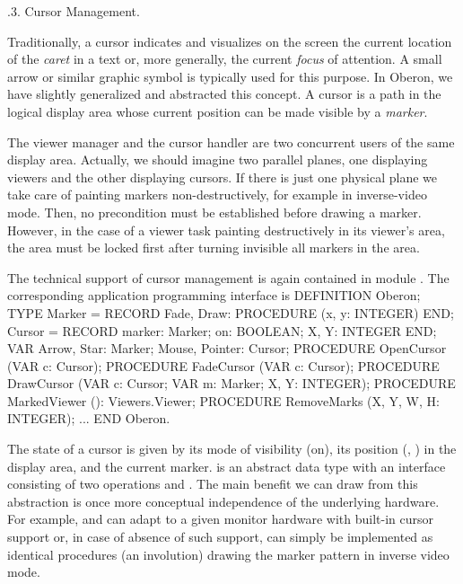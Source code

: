 
.3. Cursor Management.

Traditionally, a cursor indicates and visualizes on the screen the
current location of the \emph{caret} in a text or, more generally, the
current \emph{focus} of attention. A small arrow or similar graphic symbol is
typically used for this purpose. In Oberon, we have slightly
generalized and abstracted this concept. A cursor is a path in the
logical display area whose current position can be made visible by a
\emph{marker}.

The viewer manager and the cursor handler are two concurrent users of
the same display area. Actually, we should imagine two parallel
planes, one displaying viewers and the other displaying cursors. If
there is just one physical plane we take care of painting markers
non-destructively, for example in inverse-video mode. Then, no
precondition must be established before drawing a marker. However, in
the case of a viewer task painting destructively in its viewer's area,
the area must be locked first after turning invisible all markers in
the area.

The technical support of cursor management is again contained in
module . The corresponding application programming interface is
\begintt
DEFINITION Oberon;
  TYPE Marker = RECORD
      Fade, Draw: PROCEDURE (x, y: INTEGER)
    END;
    Cursor = RECORD
      marker: Marker;
      on: BOOLEAN;
      X, Y: INTEGER
    END;
  VAR Arrow, Star: Marker;
      Mouse, Pointer: Cursor;
  PROCEDURE OpenCursor (VAR c: Cursor);
  PROCEDURE FadeCursor (VAR c: Cursor);
  PROCEDURE DrawCursor (VAR c: Cursor; VAR m: Marker;
                        X, Y: INTEGER);
  PROCEDURE MarkedViewer (): Viewers.Viewer;
  PROCEDURE RemoveMarks (X, Y, W, H: INTEGER);
  ...
END Oberon.
\endtt

\noindent The state of a cursor is given by its mode of visibility (on), its
position (, ) in the display area, and the current marker.  is
an abstract data type with an interface consisting of two operations
 and . The main benefit we can draw from this abstraction is
once more conceptual independence of the underlying hardware. For
example,  and  can adapt to a given monitor hardware with
built-in cursor support or, in case of absence of such support, can
simply be implemented as identical procedures (an involution) drawing
the marker pattern in inverse video mode.

